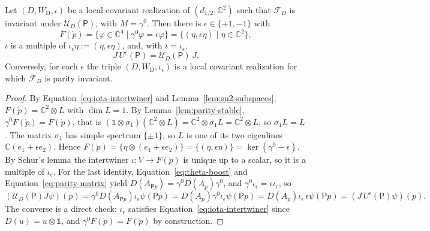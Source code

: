 	\begin{proposition}\label{prop:rest-selection}
		Let $(D,W_{\mathrm{D}},\iota)$ be a local covariant realization of $(d_{1/2},\mathbb{C}^2)$ such that $\mathcal{F}_D$ is invariant under $\mathcal{U}_D(\mathsf{P})$, with $M=\gamma^0$. Then there is $\epsilon\in\{+1,-1\}$ with
		\begin{equation}\label{eq:rest-subspace}
			F(\mathring{p})=\{\varphi\in\mathbb{C}^4\mid\gamma^0\varphi=\epsilon\varphi\}=\{(\eta,\epsilon\eta)\mid\eta\in\mathbb{C}^2\},
		\end{equation}
		$\iota$ is a multiple of $\iota_\epsilon\eta:=(\eta,\epsilon\eta)$, and, with $\iota=\iota_\epsilon$,
		\begin{equation*}
			J\,U^\epsilon(\mathsf{P})=\mathcal{U}_D(\mathsf{P})\,J.
		\end{equation*}
		Conversely, for each $\epsilon$ the triple $(D,W_{\mathrm{D}},\iota_\epsilon)$ is a local covariant realization for which $\mathcal{F}_D$ is parity invariant.
	\end{proposition}
	
	\begin{proof}
		By Equation~\eqref{eq:iota-intertwiner} and Lemma~\ref{lem:su2-subspaces}, $F(\mathring{p})=\mathbb{C}^2\otimes L$ with $\dim L=1$. By Lemma~\ref{lem:parity-stable}, $\gamma^0F(\mathring{p})=F(\mathring{p})$, that is $(\mathbb{1}\otimes\sigma_1)(\mathbb{C}^2\otimes L)=\mathbb{C}^2\otimes\sigma_1L=\mathbb{C}^2\otimes L$, so $\sigma_1L=L$. The matrix $\sigma_1$ has simple spectrum $\{\pm1\}$, so $L$ is one of its two eigenlines $\mathbb{C}(e_1+\epsilon e_2)$. Hence $F(\mathring{p})=\{\eta\otimes(e_1+\epsilon e_2)\}=\{(\eta,\epsilon\eta)\}=\ker(\gamma^0-\epsilon)$. By Schur's lemma the intertwiner $\iota:V\to F(\mathring{p})$ is unique up to a scalar, so it is a multiple of $\iota_\epsilon$. For the last identity, Equation~\eqref{eq:theta-boost} and Equation~\eqref{eq:parity-matrix} yield $D(A_{\mathsf{P}p})=\gamma^0D(A_p)\gamma^0$, and $\gamma^0\iota_\epsilon=\epsilon\iota_\epsilon$, so
		\begin{equation*}
			(\mathcal{U}_D(\mathsf{P})J\psi)(p)=\gamma^0D(A_{\mathsf{P}p})\iota_\epsilon\psi(\mathsf{P}p)=D(A_p)\gamma^0\iota_\epsilon\psi(\mathsf{P}p)=D(A_p)\iota_\epsilon\,\epsilon\psi(\mathsf{P}p)=(J\,U^\epsilon(\mathsf{P})\psi)(p).
		\end{equation*}
		The converse is a direct check: $\iota_\epsilon$ satisfies Equation~\eqref{eq:iota-intertwiner} since $D(u)=u\otimes\mathbb{1}$, and $\gamma^0F(\mathring{p})=F(\mathring{p})$ by construction.
	\end{proof}
	
